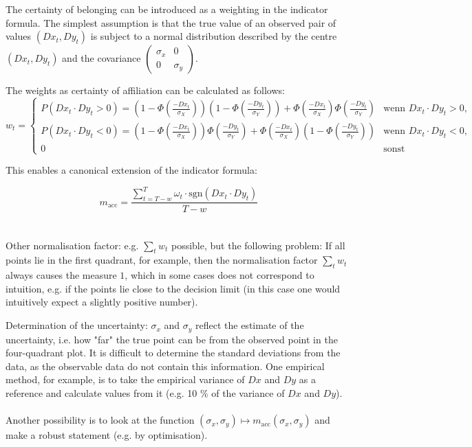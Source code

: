 \documentclass[oneside]{article}
\theoremstyle{plain}%
\theoremstyle{definition}
\begin{document}
The certainty of belonging can be introduced as a weighting in the indicator formula. The simplest assumption is that the true value of an observed pair of values $(Dx_t,Dy_t)$ is subject to a normal distribution described by the centre $(Dx_t,Dy_t)$ and the covariance 
$\begin{pmatrix} \sigma_x & 0 \\
0 & \sigma_y 
\end{pmatrix}$.

The weights as certainty of affiliation can be calculated as follows:
\[ 
w_t = 
\begin{cases} 
  P(Dx_t \cdot Dy_t > 0) = \left(1 - \Phi\left(\frac{-Dx_t}{\sigma_X}\right)\right)\left(1 - \Phi\left(\frac{-Dy_t}{\sigma_Y}\right)\right) + \Phi\left(\frac{-Dx_t}{\sigma_X}\right) \Phi\left(\frac{-Dy_t}{\sigma_Y}\right) & \text{wenn } Dx_t \cdot Dy_t > 0,  \\
  P(Dx_t \cdot Dy_t < 0) = \left(1 - \Phi\left(\frac{-Dx_t}{\sigma_X}\right)\right) \Phi\left(\frac{-Dy_t}{\sigma_Y}\right) + \Phi\left(\frac{-Dx_t}{\sigma_X}\right) \left(1 - \Phi\left(\frac{-Dy_t}{\sigma_Y}\right)\right)  & \text{wenn } Dx_t \cdot Dy_t < 0,  \\
  0 & \text{sonst} 
\end{cases}
\]

This enables a canonical extension of the indicator formula:


\[m_{\text{acc}} = \frac{\sum_{t=T-w}^T \omega_t \cdot \text{sgn}(Dx_t\cdot Dy_t)}{T-w}\]\\\\
Other normalisation factor: e.g. $\sum_t w_t$ possible, but the following problem: If all points lie in the first quadrant, for example, then the normalisation factor $\sum_t w_t$ always causes the measure $1$, which in some cases does not correspond to intuition, e.g. if the points lie close to the decision limit (in this case one would intuitively expect a slightly positive number). 

Determination of the uncertainty: $\sigma_x$ and $\sigma_y$ reflect the estimate of the uncertainty, i.e. how "far" the true point can be from the observed point in the four-quadrant plot. It is difficult to determine the standard deviations from the data, as the observable data do not contain this information. One empirical method, for example, is to take the empirical variance of $Dx$ and $Dy$ as a reference and calculate values from it (e.g. 10 $\%$ of the variance of $Dx$ and $Dy$).\\\\
Another possibility is to look at the function $(\sigma_x,\sigma_y)\mapsto m_{\text{acc}}(\sigma_x,\sigma_y)$ and make a robust statement (e.g. by optimisation).
\end{document}
